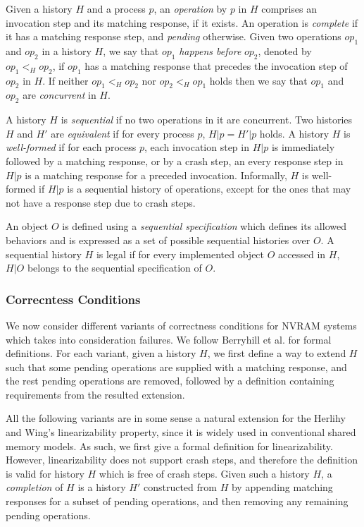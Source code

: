 Given a history $H$ and a process $p$, an \textit{operation} by $p$ in $H$ comprises an invocation step and its matching response, if it exists. An operation is \textit{complete} if it has a matching response step, and \textit{pending} otherwise. Given two operations $op_1$ and $op_2$ in a history $H$, we say that $op_1$ \textit{happens before} $op_2$, denoted by $op_1 <_H op_2$, if $op_1$ has a matching
response that precedes the invocation step of $op_2$ in $H$. If neither $op_1 <_H op_2$ nor $op_2 <_H op_1$ holds then we say that $op_1$ and $op_2$ are \textit{concurrent} in $H$.

A history $H$ is \textit{sequential} if no two operations in it are concurrent. Two histories $H$ and $H'$ are \textit{equivalent} if for every process $p$, $H|p = H'|p$ holds. A history $H$ is \textit{well-formed} if for each process $p$, each invocation step in $H|p$ is immediately followed by a matching response, or by a crash step, an every response step in $H|p$ is a matching response for a preceded invocation. Informally, $H$ is well-formed if $H|p$ is a sequential history of operations, except for the ones that may not have a response step due to crash steps.

An object $O$ is defined using a \textit{sequential specification} which defines its allowed behaviors and is expressed as a set of possible sequential histories over $O$. A sequential history $H$ is legal if for every implemented object $O$ accessed in $H$, $H|O$ belongs to the sequential specification of $O$.


\subsubsection{Correcntess Conditions}
We now consider different variants of correctness conditions for NVRAM systems which takes into consideration failures. We follow Berryhill et al. \cite{DBLP:conf/opodis/BerryhillGT15} for formal definitions. For each variant, given a history $H$, we first define a way to extend $H$ such that some pending operations are supplied with a matching response, and the rest pending operations are removed, followed by a definition containing requirements from the resulted extension.

All the following variants are in some sense a natural extension for the Herlihy and Wing's linearizability property, since it is widely used in conventional shared memory models. As such, we first give a formal definition for linearizability. However, linearizability does not support crash steps, and therefore the definition is valid for history $H$ which is free of crash steps. Given such a history $H$, a \textit{completion} of $H$ is a history $H'$ constructed from $H$ by appending matching responses for a subset of pending operations, and then removing any remaining pending operations.

